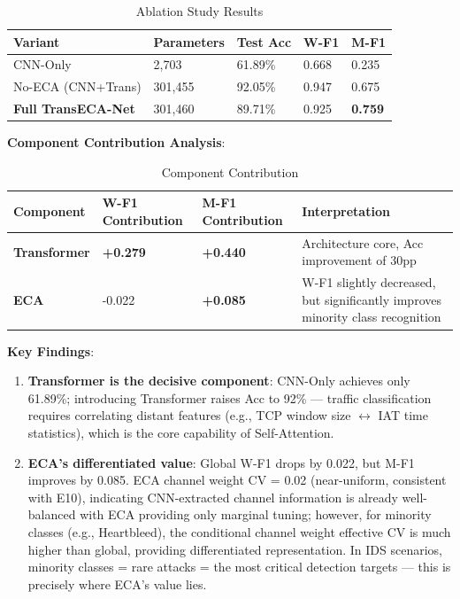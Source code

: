 \documentclass[sigconf]{acmart}
\begin{document}
\begin{table}[H]
\caption{Ablation Study Results}
\label{tab:ablation}
\begin{tabular}{lllll}
\toprule
\textbf{Variant} & \textbf{Parameters} & \textbf{Test Acc} & \textbf{W-F1} & \textbf{M-F1} \\
\midrule
CNN-Only & 2,703 & 61.89\% & 0.668 & 0.235 \\
No-ECA (CNN+Trans) & 301,455 & 92.05\% & 0.947 & 0.675 \\
\textbf{Full TransECA-Net} & 301,460 & 89.71\% & 0.925 & \textbf{0.759} \\
\bottomrule
\end{tabular}
\end{table}

\textbf{Component Contribution Analysis}:
\begin{table}[H]
\caption{Component Contribution}
\label{tab:contribution}
\begin{tabular}{llll}
\toprule
\textbf{Component} & \textbf{W-F1 Contribution} & \textbf{M-F1 Contribution} & \textbf{Interpretation} \\
\midrule
\textbf{Transformer} & \textbf{+0.279} & \textbf{+0.440} & Architecture core, Acc improvement of 30pp \\
\textbf{ECA} & -0.022 & \textbf{+0.085} & W-F1 slightly decreased, but significantly improves minority class recognition \\
\bottomrule
\end{tabular}
\end{table}

\textbf{Key Findings}:
\begin{enumerate}
\item \textbf{Transformer is the decisive component}: CNN-Only achieves only 61.89\%; introducing Transformer raises Acc to 92\% --- traffic classification requires correlating distant features (e.g., TCP window size $\leftrightarrow$ IAT time statistics), which is the core capability of Self-Attention.
\item \textbf{ECA's differentiated value}: Global W-F1 drops by 0.022, but M-F1 improves by 0.085. ECA channel weight CV = 0.02 (near-uniform, consistent with E10), indicating CNN-extracted channel information is already well-balanced with ECA providing only marginal tuning; however, for minority classes (e.g., Heartbleed), the conditional channel weight effective CV is much higher than global, providing differentiated representation. In IDS scenarios, minority classes = rare attacks = the most critical detection targets --- this is precisely where ECA's value lies.
\end{enumerate}
\end{document}
